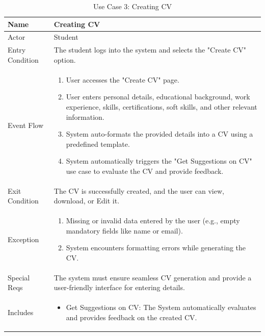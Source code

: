 \begin{table}[H]
\centering
\begin{tabular}{|l|p{12cm}|}
\hline
Name             & Creating CV \\ \hline
Actor            & Student \\ \hline
Entry Condition  & 
The student logs into the system and selects the "Create CV" option. \\ \hline
Event Flow       & 
\begin{enumerate}
    \item User accesses the "Create CV" page.
    \item User enters personal details, educational background, work experience, skills, certifications, soft skills, and other relevant information.
    \item System auto-formats the provided details into a CV using a predefined template.
    \item System automatically triggers the "Get Suggestions on CV" use case to evaluate the CV and provide feedback.
\end{enumerate} \\ \hline
Exit Condition   & 
The CV is successfully created, and the user can view, download, or Edit it. \\ \hline
Exception        & 
\begin{enumerate}
    \item Missing or invalid data entered by the user (e.g., empty mandatory fields like name or email).
    \item System encounters formatting errors while generating the CV.
\end{enumerate} \\ \hline
Special Reqs     & 
The system must ensure seamless CV generation and provide a user-friendly interface for entering details. \\ \hline
Includes        & 
\begin{itemize}
    \item Get Suggestions on CV: The System automatically evaluates and provides feedback on the created CV. 
\end{itemize} \\ \hline
\end{tabular}
\caption{Use Case 3: Creating CV}
\label{tab:create_cv}
\end{table}

